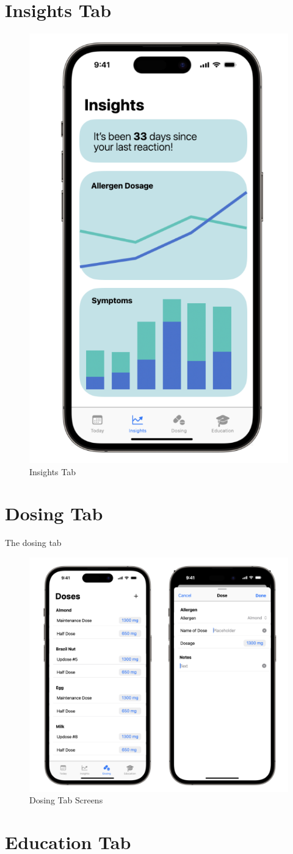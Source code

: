 \section{Insights Tab}

\begin{figure}[H]
    \centering
    \includegraphics[width=0.3\linewidth]{thesis//chapters//images/insightsTab.png}
    \caption{Insights Tab}
    \label{fig:insights-tab}
\end{figure}

\section{Dosing Tab}

The dosing tab

\begin{figure}[H]
    \centering
    \includegraphics[width=0.7\linewidth]{thesis//chapters//images/dosingTabScreens.png}
    \caption{Dosing Tab Screens}
    \label{fig:dosing-tab}
\end{figure}

\section{Education Tab}

